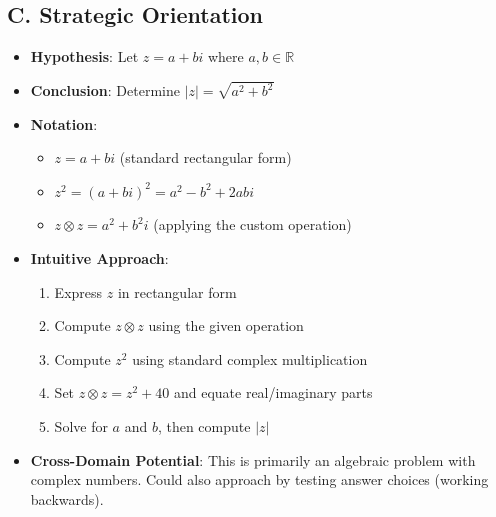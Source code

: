 \documentclass[12pt]{article}
\begin{document}
\begin{problemconfigbox}
\subsection*{C. Strategic Orientation}
\begin{itemize}[leftmargin=*]
    \item \textbf{Hypothesis}: Let $z = a + bi$ where $a, b \in \mathbb{R}$
    \item \textbf{Conclusion}: Determine $|z| = \sqrt{a^2 + b^2}$
    \item \textbf{Notation}: 
    \begin{itemize}
        \item $z = a + bi$ (standard rectangular form)
        \item $z^2 = (a+bi)^2 = a^2 - b^2 + 2abi$
        \item $z \otimes z = a^2 + b^2i$ (applying the custom operation)
    \end{itemize}
    \item \textbf{Intuitive Approach}: 
    \begin{enumerate}
        \item Express $z$ in rectangular form
        \item Compute $z \otimes z$ using the given operation
        \item Compute $z^2$ using standard complex multiplication
        \item Set $z \otimes z = z^2 + 40$ and equate real/imaginary parts
        \item Solve for $a$ and $b$, then compute $|z|$
    \end{enumerate}
    \item \textbf{Cross-Domain Potential}: This is primarily an algebraic problem with complex numbers. Could also approach by testing answer choices (working backwards).
\end{itemize}
\end{problemconfigbox}
\end{document}
